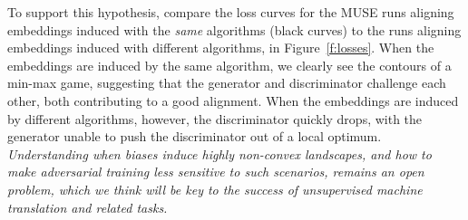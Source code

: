 \documentclass[11pt,a4paper]{article}
\begin{document}
To support this hypothesis, compare the loss curves for the MUSE runs aligning embeddings induced with the {\em same} algorithms (black curves) to the runs aligning embeddings induced with different algorithms, in Figure~\ref{f:losses}. When the embeddings are induced by the same algorithm, we clearly see the contours of a min-max game, suggesting that the generator and discriminator challenge each other, both contributing to a good alignment. When the embeddings are induced by different algorithms, however, the discriminator quickly drops, with the generator unable to push the discriminator out of a local optimum. {\em Understanding when biases induce highly non-convex landscapes, and how to make adversarial training less sensitive to such scenarios, remains an open problem, which we think will be key to the success of unsupervised machine translation and related tasks.} 




\end{document}
